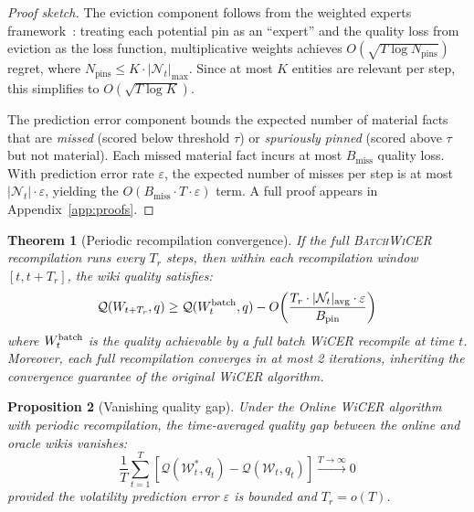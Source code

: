 \documentclass{article}
\newtheorem{theorem}{Theorem}[section]
\newtheorem{proposition}[theorem]{Proposition}
\newcommand{\wt}{\mathcal{W}_t}
\newcommand{\nt}{\mathcal{N}_t}
\begin{document}
\begin{proof}[Proof sketch]
The eviction component follows from the weighted experts framework~\citep{cesa2006prediction}: treating each potential pin as an ``expert'' and the quality loss from eviction as the loss function, multiplicative weights achieves $O(\sqrt{T \log N_{\text{pins}}})$ regret, where $N_{\text{pins}} \leq K \cdot |\nt|_{\max}$.
Since at most $K$ entities are relevant per step, this simplifies to $O(\sqrt{T \log K})$.

The prediction error component bounds the expected number of material facts that are \emph{missed} (scored below threshold $\tau$) or \emph{spuriously pinned} (scored above $\tau$ but not material).
Each missed material fact incurs at most $B_{\text{miss}}$ quality loss.
With prediction error rate $\varepsilon$, the expected number of misses per step is at most $|\nt| \cdot \varepsilon$, yielding the $O(B_{\text{miss}} \cdot T \cdot \varepsilon)$ term.
A full proof appears in Appendix~\ref{app:proofs}.
\end{proof}

\begin{theorem}[Periodic recompilation convergence]
\label{thm:convergence}
If the full \textsc{BatchWiCER} recompilation runs every $T_r$ steps, then within each recompilation window $[t, t+T_r]$, the wiki quality satisfies:
\begin{equation}
  \mathcal{Q}(W_{t+T_r}, q) \geq \mathcal{Q}(W_t^{\textup{batch}}, q) - O\!\left(\frac{T_r \cdot |\nt|_{\textup{avg}} \cdot \varepsilon}{B_{\textup{pin}}}\right)
\end{equation}
where $W_t^{\textup{batch}}$ is the quality achievable by a full batch WiCER recompile at time $t$.
Moreover, each full recompilation converges in at most 2 iterations, inheriting the convergence guarantee of the original WiCER algorithm.
\end{theorem}

\begin{proposition}[Vanishing quality gap]
\label{prop:vanishing}
Under the Online WiCER algorithm with periodic recompilation, the time-averaged quality gap between the online and oracle wikis vanishes:
\begin{equation}
  \frac{1}{T} \sum_{t=1}^T \left[\mathcal{Q}(\wt^*, q_t) - \mathcal{Q}(\wt, q_t)\right] \xrightarrow{T \to \infty} 0
\end{equation}
provided the volatility prediction error $\varepsilon$ is bounded and $T_r = o(T)$.
\end{proposition}
\end{document}
